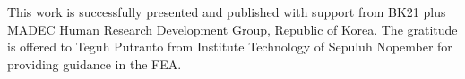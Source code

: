 \documentclass[../Final.tex]{subfiles}
\begin{document}
This work is successfully presented and published with support from BK21 plus MADEC Human Research Development Group, Republic of Korea. 
The gratitude is offered to Teguh Putranto from Institute Technology of Sepuluh Nopember for providing guidance in the FEA. 
\end{document}
